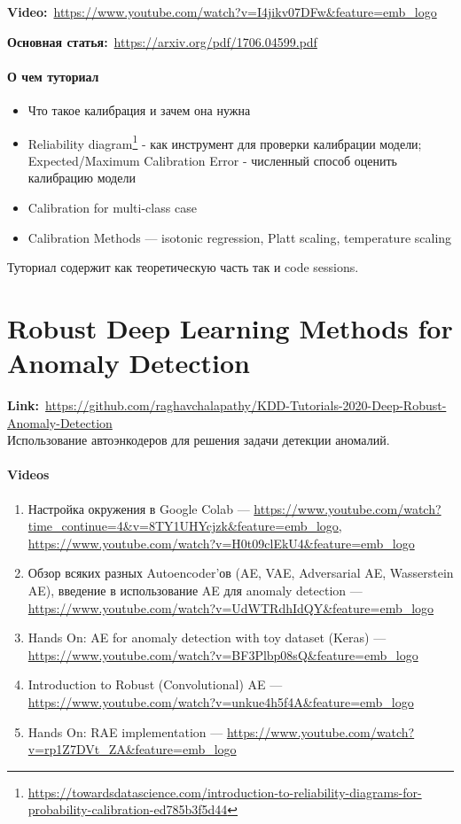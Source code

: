 \textbf{Video:}~\url{https://www.youtube.com/watch?v=I4jikv07DFw&feature=emb_logo}

\textbf{Основная статья:}~\url{https://arxiv.org/pdf/1706.04599.pdf}

\paragraph{О чем туториал}

\begin{itemize}
    \item Что такое калибрация и зачем она нужна
    \item Reliability diagram\footnote{\url{https://towardsdatascience.com/introduction-to-reliability-diagrams-for-probability-calibration-ed785b3f5d44}} - как инструмент для проверки калибрации модели; Expected/Maximum Calibration Error - численный способ оценить калибрацию модели
    \item Calibration for multi-class case
    \item Calibration Methods --- isotonic regression, Platt scaling, temperature scaling
\end{itemize}

Туториал содержит как теоретическую часть так и code sessions.


\section{Robust Deep Learning Methods for Anomaly Detection} 

\textbf{Link:}~\url{https://github.com/raghavchalapathy/KDD-Tutorials-2020-Deep-Robust-Anomaly-Detection} \\

Использование автоэнкодеров для решения задачи детекции аномалий. 

\paragraph{Videos}

\begin{enumerate}
    \item Настройка окружения в Google Colab --- \url{https://www.youtube.com/watch?time_continue=4&v=8TY1UHYcjzk&feature=emb_logo}, \url{https://www.youtube.com/watch?v=H0t09clEkU4&feature=emb_logo}
    \item Обзор всяких разных Autoencoder'ов (AE, VAE, Adversarial AE, Wasserstein AE), введение в использование AE для anomaly detection --- \url{https://www.youtube.com/watch?v=UdWTRdhIdQY&feature=emb_logo}
    \item Hands On: AE for anomaly detection with toy dataset (Keras) --- \url{https://www.youtube.com/watch?v=BF3Plbp08sQ&feature=emb_logo}
    \item Introduction to Robust (Convolutional) AE --- \url{https://www.youtube.com/watch?v=unkue4h5f4A&feature=emb_logo}
    \item Hands On: RAE implementation --- \url{https://www.youtube.com/watch?v=rp1Z7DVt_ZA&feature=emb_logo}
\end{enumerate}